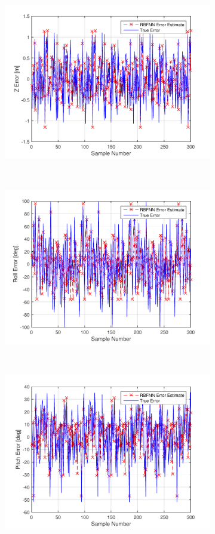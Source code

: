 \begin{figure}
\begin{subfigure}{0.3\textwidth}
    \includegraphics[width=\textwidth]{figures/chapter4/z_train}
    \caption{}
  \end{subfigure}
~
  \begin{subfigure}{0.3\textwidth}
    \includegraphics[width=\textwidth]{figures/chapter4/roll_train}
    \caption{}
  \end{subfigure}
~
  \begin{subfigure}{0.3\textwidth}
    \includegraphics[width=\textwidth]{figures/chapter4/pitch_train}

\end{subfigure}
\end{figure}
